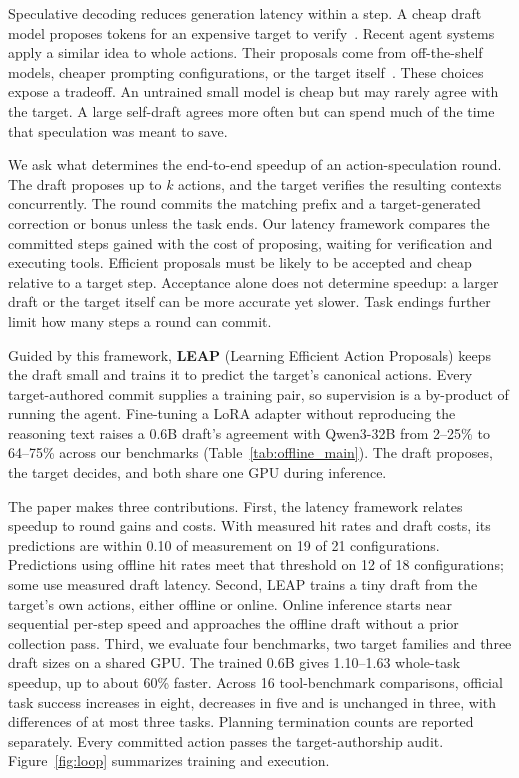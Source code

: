 Speculative decoding reduces generation latency within a step. A cheap draft model proposes tokens
for an expensive target to verify~\citep{leviathan2023,chen2023}. Recent agent systems apply a similar
idea to whole actions. Their proposals come from off-the-shelf models, cheaper prompting configurations,
or the target itself~\citep{isp,dsp,specactions,spork,swyr}. These choices expose a tradeoff.
An untrained small model is cheap but may rarely agree with the target. A large self-draft agrees
more often but can spend much of the time that speculation was meant to save.

We ask what determines the end-to-end speedup of an action-speculation round. The draft proposes
up to $k$ actions, and the target verifies the resulting contexts concurrently. The round commits
the matching prefix and a target-generated correction or bonus unless the task ends.
Our latency framework compares the committed steps gained with the cost of proposing, waiting for
verification and executing tools. Efficient proposals must be likely to be accepted and cheap relative
to a target step. Acceptance alone does not determine speedup: a larger draft or the target itself
can be more accurate yet slower. Task endings further limit how many steps a round
can commit.

Guided by this framework, \textbf{LEAP} (Learning Efficient Action Proposals) keeps the draft small
and trains it to predict the target's canonical actions. Every target-authored commit supplies a
training pair, so supervision is a by-product of running the agent. Fine-tuning a LoRA adapter without
reproducing the reasoning text raises a 0.6B draft's agreement with Qwen3-32B from 2--25\% to 64--75\%
across our benchmarks (Table~\ref{tab:offline_main}). The draft proposes, the target decides, and both
share one GPU during inference.

The paper makes three contributions. First, the latency framework relates speedup to round gains
and costs. With measured hit rates and draft costs, its predictions are within 0.10 of measurement
on 19 of 21 configurations. Predictions using offline hit rates meet that threshold on 12 of 18
configurations; some use measured draft latency. Second, LEAP trains a tiny draft from the target's
own actions, either offline or online. Online inference starts near sequential per-step speed and
approaches the offline draft without a prior collection pass. Third, we evaluate four benchmarks,
two target families and three draft sizes on a shared GPU. The trained 0.6B gives 1.10--1.63\xx{}
whole-task speedup, up to about 60\% faster. Across 16 tool-benchmark comparisons, official task
success increases in eight, decreases in five and is unchanged in three, with differences of at
most three tasks. Planning termination counts are reported separately. Every committed action
passes the target-authorship audit. Figure~\ref{fig:loop} summarizes training and execution.

